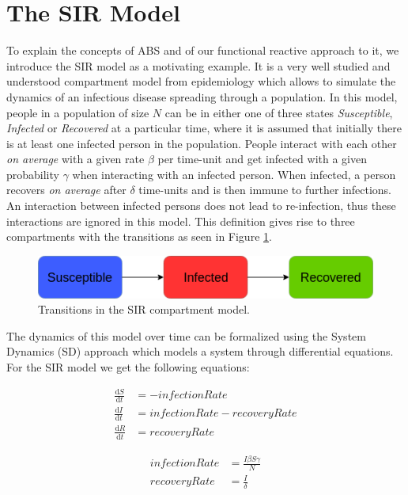\section{The SIR Model}
To explain the concepts of ABS and of our functional reactive approach to it, we introduce the SIR model as a motivating example. It is a very well studied and understood compartment model from epidemiology which allows to simulate the dynamics of an infectious disease spreading through a population. In this model, people in a population of size $N$ can be in either one of three states \textit{Susceptible}, \textit{Infected} or \textit{Recovered} at a particular time, where it is assumed that initially there is at least one infected person in the population. People interact with each other \textit{on average} with a given rate $\beta$ per time-unit and get infected with a given probability $\gamma$ when interacting with an infected person. When infected, a person recovers \textit{on average} after $\delta$ time-units and is then immune to further infections. An interaction between infected persons does not lead to re-infection, thus these interactions are ignored in this model. This definition gives rise to three compartments with the transitions as seen in Figure \ref{fig:sir_transitions}.

\begin{figure}
	\centering
	\includegraphics[width=.4\textwidth, angle=0]{./../shared/fig/diagrams/SIR_transitions.png}
	\caption{Transitions in the SIR compartment model.}
	\label{fig:sir_transitions}
\end{figure}

The dynamics of this model over time can be formalized using the System Dynamics (SD) approach which models a system through differential equations. For the SIR model we get the following equations:

\begin{align*}
\frac{\mathrm d S}{\mathrm d t} &= -infectionRate \\ 
\frac{\mathrm d I}{\mathrm d t} &= infectionRate - recoveryRate \\ 
\frac{\mathrm d R}{\mathrm d t} &= recoveryRate 
\end{align*}

\begin{align*}
infectionRate &= \frac{I \beta S \gamma}{N} \\
recoveryRate &= \frac{I}{\delta} 
\end{align*}


